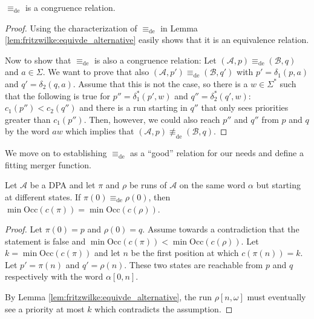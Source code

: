 \begin{lem}
	$\equiv_\text{de}$ is a congruence relation.
\end{lem}

\begin{proof}
	Using the characterization of $\equiv_\text{de}$ in Lemma \ref{lem:fritzwilke:equivde_alternative} easily shows that it is an equivalence relation.
	
	Now to show that $\equiv_\text{de}$ is also a congruence relation: Let $(\mathcal{A}, p) \equiv_\text{de} (\mathcal{B}, q)$ and $a \in \Sigma$. We want to prove that also $(\mathcal{A}, p') \equiv_\text{de} (\mathcal{B}, q')$ with $p' = \delta_1(p, a)$ and $q' = \delta_2(q, a)$. Assume that this is not the case, so there is a $w \in \Sigma^*$ such that the following is true for $p'' = \delta^*_1(p', w)$ and $q'' = \delta^*_2(q', w)$: $c_1(p'') < c_2(q'')$ and there is a run starting in $q''$ that only sees priorities greater than $c_1(p'')$. Then, however, we could also reach $p''$ and $q''$ from $p$ and $q$ by the word $aw$ which implies that $(\mathcal{A}, p) \not\equiv_\text{de} (\mathcal{B}, q)$.
\end{proof}

\vspace{15pt}

We move on to establishing $\equiv_\text{de}$ as a \enquote{good} relation for our needs and define a fitting merger function.

\begin{lem}
\label{lem:fritzwilke:equiv_states_same_minpri}
	Let $\mathcal{A}$ be a DPA and let $\pi$ and $\rho$ be runs of $\mathcal{A}$ on the same word $\alpha$ but starting at different states. If $\pi(0) \equiv_\text{de} \rho(0)$, then $\min \text{Occ}(c(\pi)) = \min \text{Occ}(c(\rho))$.
\end{lem}

\begin{proof}
	Let $\pi(0) = p$ and $\rho(0) = q$. Assume towards a contradiction that the statement is false and $\min \text{Occ}(c(\pi)) < \min \text{Occ}(c(\rho))$. Let $k = \min \text{Occ}(c(\pi))$ and let $n$ be the first position at which $c(\pi(n)) = k$. Let $p' = \pi(n)$ and $q' = \rho(n)$. These two states are reachable from $p$ and $q$ respectively with the word $\alpha[0,n]$.
	
	By Lemma \ref{lem:fritzwilke:equivde_alternative}, the run $\rho[n,\omega]$ must eventually see a priority at most $k$ which contradicts the assumption.
\end{proof}


